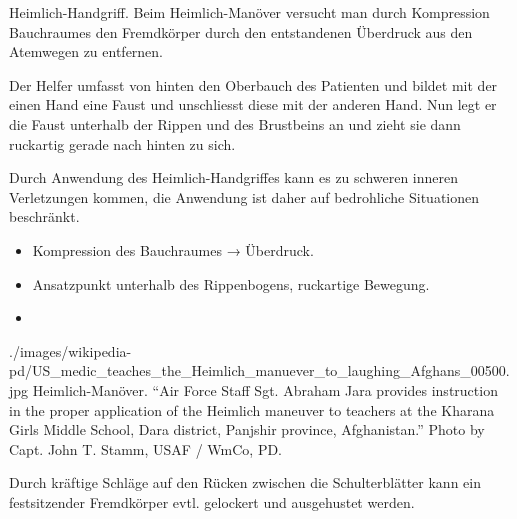 {%
 Heimlich-Handgriff. Beim Heimlich-Manöver versucht
man durch Kompression Bauchraumes den Fremdkörper durch den entstandenen
Überdruck aus den Atemwegen zu entfernen.  

Der Helfer umfasst von hinten den Oberbauch des Patienten und bildet mit
der einen Hand eine Faust und unschliesst diese mit der anderen Hand. Nun legt
er die Faust unterhalb der Rippen und des Brustbeins an und zieht sie dann
ruckartig gerade nach hinten zu sich. 

 Durch Anwendung des Heimlich-Handgriffes kann es zu
schweren inneren Verletzungen kommen, die Anwendung ist daher auf bedrohliche Situationen
beschränkt.
}{
\begin{itemize}
  \item Kompression des Bauchraumes → Überdruck.
  \item Ansatzpunkt unterhalb des Rippenbogens, ruckartige Bewegung.
  \item {}
\end{itemize}
}
{./images/wikipedia-pd/US_medic_teaches_the_Heimlich_manuever_to_laughing_Afghans_00500.jpg}
{Heimlich-Manöver.}
{"`Air Force Staff Sgt. Abraham Jara provides instruction in the proper
application of the Heimlich maneuver to teachers at the Kharana Girls Middle
School, Dara district, Panjshir province, Afghanistan."' Photo by 
Capt. John T. Stamm, USAF / WmCo, PD.}




 

 
{%
Durch kräftige Schläge auf den Rücken zwischen die Schulterblätter kann  ein
festsitzender Fremdkörper evtl. gelockert und ausgehustet werden.}
{}{}{}{}
 

 

 

 

 

 

 

 

 

 

 

 





